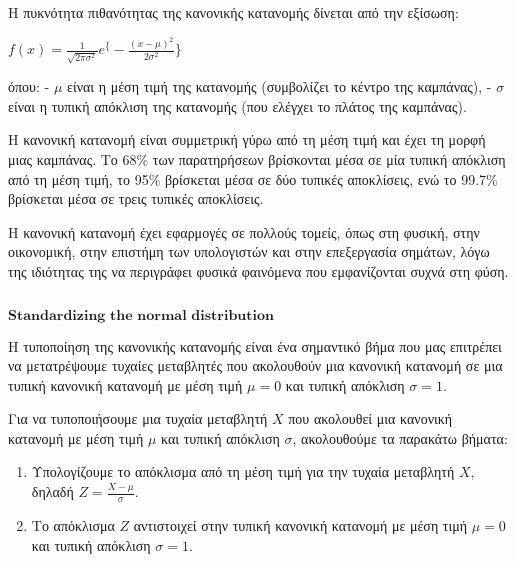 \documentclass[11pt]{article}
\makeatletter
\newcommand{\boxspacing}{\kern\kvtcb@left@rule\kern\kvtcb@boxsep}
\newcommand{\prompt}[4]{
        {\ttfamily\llap{{\color{#2}[#3]:\hspace{3pt}#4}}\vspace{-\baselineskip}}
    }
\makeatother
\begin{document}
Η πυκνότητα πιθανότητας της κανονικής κατανομής δίνεται από την εξίσωση:

$ f(x) = \frac{1}{\sqrt{2\pi\sigma^2}}
e^\{-\frac{(x-\mu)^2}{2\sigma^2}\} $

όπου: - $ \mu $ είναι η μέση τιμή της κατανομής (συμβολίζει το κέντρο
της καμπάνας), - $ \sigma $ είναι η τυπική απόκλιση της κατανομής (που
ελέγχει το πλάτος της καμπάνας).

Η κανονική κατανομή είναι συμμετρική γύρω από τη μέση τιμή και έχει τη
μορφή μιας καμπάνας. Το 68\% των παρατηρήσεων βρίσκονται μέσα σε μία
τυπική απόκλιση από τη μέση τιμή, το 95\% βρίσκεται μέσα σε δύο τυπικές
αποκλίσεις, ενώ το 99.7\% βρίσκεται μέσα σε τρεις τυπικές αποκλίσεις.

Η κανονική κατανομή έχει εφαρμογές σε πολλούς τομείς, όπως στη φυσική,
στην οικονομική, στην επιστήμη των υπολογιστών και στην επεξεργασία
σημάτων, λόγω της ιδιότητας της να περιγράφει φυσικά φαινόμενα που
εμφανίζονται συχνά στη φύση.

    \begin{tcolorbox}[breakable, size=fbox, boxrule=1pt, pad at break*=1mm,colback=cellbackground, colframe=cellborder]
\prompt{In}{incolor}{ }{\boxspacing}
\begin{Verbatim}[commandchars=\\\{\}]

\end{Verbatim}
\end{tcolorbox}

    \(\textbf{Standardizing the normal distribution}\)

    Η τυποποίηση της κανονικής κατανομής είναι ένα σημαντικό βήμα που μας
επιτρέπει να μετατρέψουμε τυχαίες μεταβλητές που ακολουθούν μια κανονική
κατανομή σε μια τυπική κανονική κατανομή με μέση τιμή $ \mu = 0 $ και
τυπική απόκλιση $ \sigma = 1 $.

Για να τυποποιήσουμε μια τυχαία μεταβλητή $ X $ που ακολουθεί μια
κανονική κατανομή με μέση τιμή $ \mu $ και τυπική απόκλιση $
\sigma $, ακολουθούμε τα παρακάτω βήματα:

\begin{enumerate}
\def\labelenumi{\arabic{enumi}.}
\item
  Υπολογίζουμε το απόκλισμα από τη μέση τιμή για την τυχαία μεταβλητή $
  X $, δηλαδή $ Z = \frac{X - \mu}{\sigma} $.
\item
  Το απόκλισμα $ Z $ αντιστοιχεί στην τυπική κανονική κατανομή με μέση
  τιμή $ \mu = 0 $ και τυπική απόκλιση $ \sigma = 1 $.
\end{enumerate}
\end{document}
